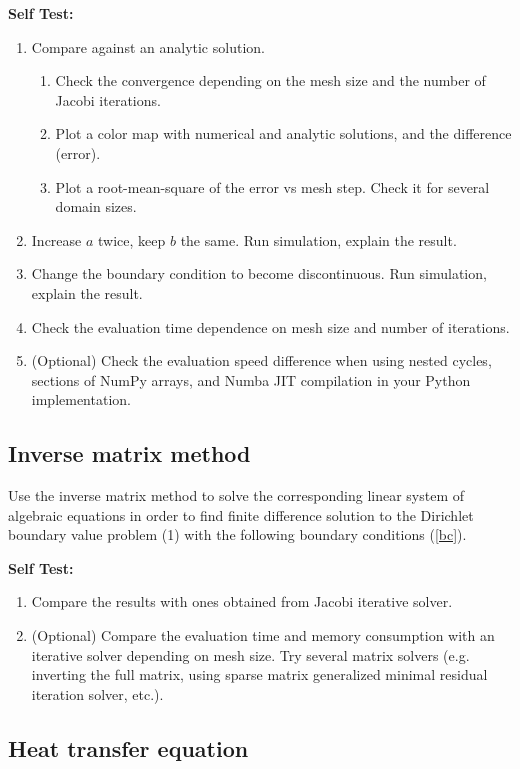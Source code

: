 \documentclass[11pt]{article}
\begin{document}
\textbf{Self Test:}
\begin{enumerate}
\item Compare against an analytic solution.
\begin{enumerate}
\item Check the convergence depending on the mesh size and the number of Jacobi iterations.
\item Plot a color map with numerical and analytic solutions, and the difference (error).
\item Plot a root-mean-square of the error vs mesh step. Check it for several domain sizes.
\end{enumerate}
\item Increase $a$ twice, keep $b$ the same. Run simulation, explain the result.
\item Change the boundary condition to become discontinuous.  Run simulation, explain the result.
\item Check the evaluation time dependence on mesh size and number of iterations.
\item (Optional) Check the evaluation speed difference when using nested cycles, sections of NumPy arrays, and Numba JIT compilation in your Python implementation.
\end{enumerate}



\subsection{Inverse matrix method}
\label{sec:inverse-matr-meth}

Use the inverse matrix method to solve the corresponding linear system
of algebraic equations in order to find finite difference solution
to the Dirichlet boundary value problem (1) with the following
boundary conditions (\ref{bc}).

\textbf{Self Test:}
\begin{enumerate}
\item Compare the results with ones obtained from Jacobi iterative solver.
\item (Optional) Compare the evaluation time and memory consumption with an iterative solver depending on mesh size. Try several matrix solvers (e.g. inverting the full matrix, using sparse matrix generalized minimal residual iteration solver, etc.).
\end{enumerate}

\subsection{Heat transfer equation}
\end{document}
